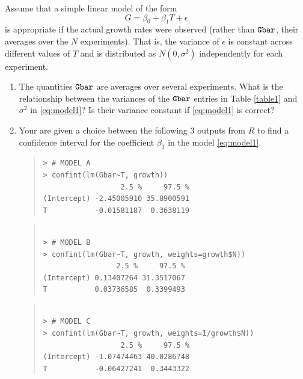 \documentclass{article}
\begin{document}
\begin{enumerate}
Assume that a simple linear model of the form
\begin{equation}
  \label{eq:model1}
G = \beta_0 + \beta_1 T + \epsilon  
\end{equation}
is appropriate if the actual growth rates were observed (rather
than ${\tt Gbar}$, their averages over the $N$ experiments). That is,
the variance of $\epsilon$ is constant across different values of $T$
and is distributed as $N(0,\sigma^2)$ independently for each experiment.

\begin{enumerate}

\item The quantities ${\tt Gbar}$ are averages over several experiments. 
What is the relationship between the variances  of the ${\tt Gbar}$ entries in Table \ref{table1} and $\sigma^2$ in \eqref{eq:model1}? Is their variance constant
if \eqref{eq:model1} is correct?

\vspace{3in}


\item Your are given a choice between the following 3 outputs from $R$ to
find a confidence interval for the coefficient $\beta_1$ in the model \eqref{eq:model1}.

\begin{quote}
\begin{verbatim}
> # MODEL A
> confint(lm(Gbar~T, growth))
                  2.5 %     97.5 %
(Intercept) -2.45005910 35.8900591
T           -0.01581187  0.3638119
\end{verbatim}
\end{quote}
\begin{quote}
\begin{verbatim}

> # MODEL B
> confint(lm(Gbar~T, growth, weights=growth$N))
                 2.5 %     97.5 %
(Intercept) 0.13407264 31.3517067
T           0.03736585  0.3399493

\end{verbatim}
\end{quote}
\begin{quote}
\begin{verbatim}

> # MODEL C
> confint(lm(Gbar~T, growth, weights=1/growth$N))
                  2.5 %     97.5 %
(Intercept) -1.07474463 40.0286748
T           -0.06427241  0.3443322

\end{verbatim}
\end{quote}


\end{enumerate}
\end{enumerate}
\end{document}
